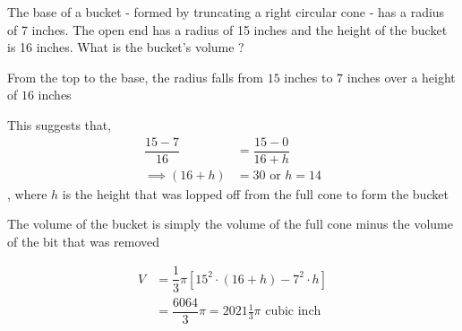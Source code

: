 

\question[3] The base of a bucket - formed by truncating a right circular cone - 
has a radius of 7 inches. The open end has a radius of 15 inches and the height 
of the bucket is 16 inches. What is the bucket's volume ?



\ifprintanswers
\fi 

\begin{solution}[\fullpage]
	From the top to the base, the radius falls from $15$ inches to $7$ inches 
	over a height of $16$ inches
	
	This suggests that, 
	\begin{align}
		\dfrac{15-7}{16} &= \dfrac{15-0}{16+h} \\
		\implies (16+h) &= 30 \text{ or } h = 14
	\end{align}
	, where $h$ is the height that was lopped off from the full cone to form the bucket
	
	The volume of the bucket is simply the volume of the full cone 
	minus the volume of the bit that was removed
	
	\begin{align}
	   V &= \dfrac{1}{3}\pi\left[ 15^2\cdot(16+h) - 7^2\cdot h\right] \\
	     &= \dfrac{6064}{3}\pi = 2021\frac{1}{3}\pi \text{ cubic inch }
	\end{align}
	
\end{solution}
\ifprintanswers\begin{codex}\end{codex}\fi
